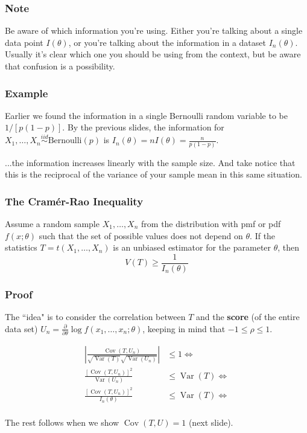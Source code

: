 \documentclass{beamer}
\begin{document}
\begin{frame}
\frametitle{Note}

Be aware of which information you're using. Either you're talking about a single data point $I(\theta)$, or you're talking about the information in a dataset $I_n(\theta)$. Usually it's clear which one you should be using from the context, but be aware that confusion is a possibility.

\end{frame}

\begin{frame}
\frametitle{Example}

Earlier we found the information in a single Bernoulli random variable to be $1/[p(1-p)]$. By the previous slides, the information for $X_1, \ldots, X_n \overset{iid}{\sim} \text{Bernoulli}(p)$ is $I_n(\theta) = nI(\theta) = \frac{n}{p(1-p)}$.
\newline
\pause

...the information increases linearly with the sample size. And take notice that this is the reciprocal of the variance of your sample mean in this same situation.
\end{frame}

\begin{frame}
\frametitle{The Cram\'er-Rao Inequality}

Assume a random sample $X_1, \ldots, X_n$ from the distribution with pmf or pdf $f(x;\theta)$ such that the set of possible values does not depend on $\theta$. If the statistics $T = t(X_1, \ldots, X_n)$ is an unbiased estimator for the parameter $\theta$, then 
\[
V(T) \ge \frac{1}{I_n(\theta)}
\]


\end{frame}

\begin{frame}
\frametitle{Proof}

The ``idea" is to consider the correlation between $T$ and the \textbf{score} (of the entire data set) $U_n = \frac{\partial}{\partial \theta} \log f(x_1, \ldots, x_n;\theta)$, keeping in mind that $-1 \le \rho \le 1$. 

\begin{align*}
\left| \frac{\operatorname{Cov}(T,U_n) }{\sqrt{\operatorname{Var}(T) }\sqrt{\operatorname{Var}(U_n) }}\right| &\le 1 \iff \\
\frac{ \left[ \operatorname{Cov}(T,U_n)\right]^2}{\operatorname{Var}(U_n)} &\le \operatorname{Var}(T) \iff \\
\frac{ \left[ \operatorname{Cov}(T,U_n)\right]^2}{I_n(\theta) } &\le \operatorname{Var}(T) \iff \\
\end{align*}

The rest follows when we show $\operatorname{Cov}(T,U) = 1$ (next slide).

\end{frame}
\end{document}
